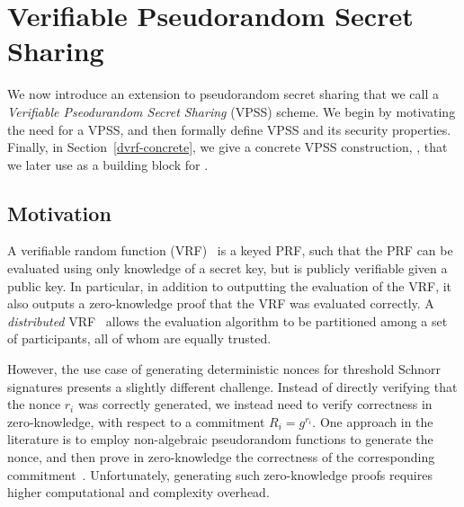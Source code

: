 \section{Verifiable Pseudorandom Secret Sharing}


We now introduce an extension to pseudorandom secret sharing that we call a  \emph{Verifiable Pseodurandom Secret Sharing} (VPSS) scheme.
We begin by motivating the need for a VPSS,
and then formally define VPSS and its security properties.
Finally,
in Section~\ref{dvrf-concrete},
we give a concrete VPSS construction, \DVRFOne, that we later use as a building block for \glitter.


\subsection{Motivation}

A verifiable random function (VRF)~\cite{MicaliRV99} is a keyed PRF,
such that the PRF can be evaluated using only knowledge of a secret key,
but is publicly verifiable given a public key.
In particular, in addition to outputting the evaluation of the VRF,
it also outputs a zero-knowledge proof that the VRF was evaluated correctly.
A \emph{distributed} VRF~\cite{NaorPR99,Dodis03,GalindoLOW21} allows the evaluation algorithm to be partitioned among a set of participants,
all of whom are equally trusted.

%
However, the use case of generating deterministic nonces for threshold Schnorr signatures presents a slightly different challenge.
Instead of directly verifying that the nonce $r_i$ was correctly generated,
we instead need to verify correctness in zero-knowledge,
with respect to a commitment $R_i = g^{r_i}$.
One approach in the literature is to employ non-algebraic pseudorandom functions to generate the nonce,
and then prove in zero-knowledge the correctness of the corresponding commitment~\cite{NickRSW20,GarillotKMN21}.
Unfortunately, generating such zero-knowledge proofs requires higher computational and complexity overhead.

